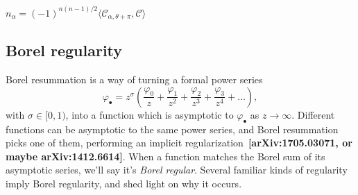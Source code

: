 \documentclass[11pt,a4paper,twoside,leqno,noamsfonts]{amsart}
\numberwithin{equation}{section}
\newcommand{\series}[1]{#1_\bullet}
\begin{document}
$n_\alpha=(-1)^{n(n-1)/2}\langle \mathcal{C}_{\alpha,\theta+\pi},\mathcal{C}\rangle$ 

\color{black}

\subsection{Borel regularity}

Borel resummation is a way of turning a formal power series
\[ \series{\varphi} = z^\sigma \left( \frac{\varphi_0}{z} + \frac{\varphi_1}{z^2} + \frac{\varphi_2}{z^3} + \frac{\varphi_3}{z^4} + \ldots \right), \]
with $\sigma \in [0, 1)$, into a function which is asymptotic to $\series{\varphi}$ as $z \to \infty$. Different functions can be asymptotic to the same power series, and Borel resummation picks one of them, performing an implicit regularization~\textbf{[arXiv:1705.03071, or maybe arXiv:1412.6614]}. When a function matches the Borel sum of its asymptotic series, we'll say it's {\em Borel regular}. Several familiar kinds of regularity imply Borel regularity, and shed light on why it occurs.
\end{document}
